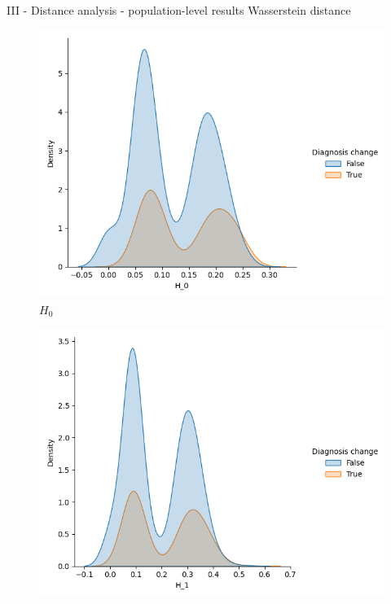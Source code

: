 \documentclass[aspectratio=169, 10pt, dvipsnames]{beamer}
\begin{document}
\begin{frame}[fragile]{III - Distance analysis - population-level results}
Wasserstein distance\\
  \begin{figure}
    \centering
    \includegraphics[width=\textwidth]{figures/temporal_evolution/wasserstein_H_0_dist_diag_change.png}
    \caption{$H_0$}
  \end{figure}
  \endminipage
  \hfill
  \begin{figure}
    \centering
    \includegraphics[width=\textwidth]{figures/temporal_evolution/wasserstein_H_1_dist_diag_change.png}

\end{figure}
\end{frame}
\end{document}
